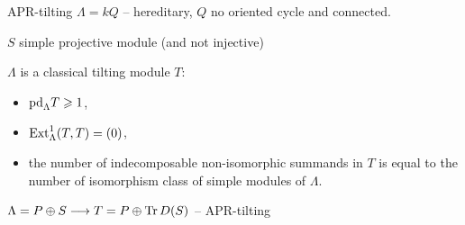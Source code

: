 \begin{frame}[fragile]{APR-tilting}
$\Lambda=kQ$ -- hereditary, $Q$ no oriented cycle and connected.\medskip 

$S$ simple projective module (and not injective)

$\Lambda$ is a classical tilting module $T$: 
\begin{itemize}
\item ${\operatorname{pd}\nolimits}_\Lambda T \geqslant 1$, 
\item $\operatorname{Ext}\nolimits^1_\Lambda(T,T) = (0)$, 
\item the number of indecomposable non-isomorphic summands in $T$ is
  equal to the number of isomorphism class of simple modules of
  $\Lambda$. 
\end{itemize}

$\Lambda = P \oplus S \longrightarrow T = P\oplus \operatorname{Tr}\nolimits D(S)$ -- APR-tilting







\end{frame}

